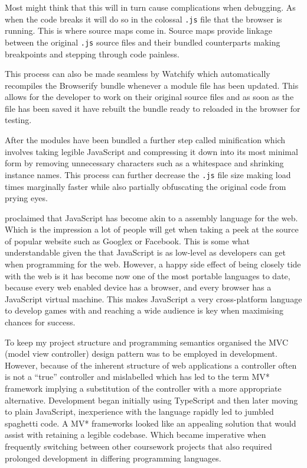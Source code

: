 \documentclass[final]{cmpreport}
\begin{document}
Most might think that this will in turn cause complications when debugging. As when the code breaks it will do so in the colossal \texttt{.js} file that the browser is running. This is where source maps come in. Source maps provide linkage between the original \texttt{.js} source files and their bundled counterparts making breakpoints and stepping through code painless. \cite{Seddon}

This process can also be made seamless by Watchify which automatically recompiles the Browserify bundle whenever a module file has been updated. This allows for the developer to work on their original source files and as soon as the file has been saved it have rebuilt the bundle ready to reloaded in the browser for testing.

After the modules have been bundled a further step called minification which involves taking legible JavaScript and compressing it down into its most minimal form by removing unnecessary characters such as a whitespace and shrinking instance names. This process can further decrease the \texttt{.js} file size making load times marginally faster while also partially obfuscating the original code from prying eyes.

\cite{Hanselman} proclaimed that JavaScript has become akin to a assembly language for the web. Which is the impression a lot of people will get when taking a peek at the source of popular website such as Googlex or Facebook. This is some what understandable given the that JavaScript is as low-level as developers can get when programming for the web. However, a happy side effect of being closely tide with the web is it has become now one of the most portable languages to date, because every web enabled device has a browser, and every browser has a JavaScript virtual machine. This makes JavaScript a very cross-platform language to develop games with and reaching a wide audience is key when maximising chances for success.

To keep my project structure and programming semantics organised the MVC (model view controller) design pattern was to be employed in development. However, because of the inherent structure of web applications a controller often is not a ``true'' controller and mislabelled which has led to the term MV* framework implying a substitution of the controller with a more appropriate alternative. Development began initially using TypeScript and then later moving to plain JavaScript, inexperience with the language rapidly led to jumbled spaghetti code. A MV* frameworks looked like an appealing solution that would assist with retaining a legible codebase.  Which became imperative when frequently switching between other coursework projects that also required prolonged development in differing programming languages.
\end{document}
